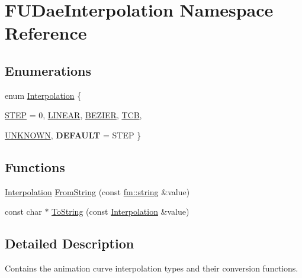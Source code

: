 \hypertarget{namespaceFUDaeInterpolation}{
\section{FUDaeInterpolation Namespace Reference}
\label{namespaceFUDaeInterpolation}
}
\subsection*{Enumerations}
\begin{DoxyCompactItemize}
\item 
enum \hyperlink{namespaceFUDaeInterpolation_a209a941c2fb6ece1325352968aa0374f}{Interpolation} \{ \par
\hyperlink{namespaceFUDaeInterpolation_a209a941c2fb6ece1325352968aa0374fa5e75d1c742698445eeb81394232221e3}{STEP} =  0, 
\hyperlink{namespaceFUDaeInterpolation_a209a941c2fb6ece1325352968aa0374fa1408bf464b40a99bef3cc2cc0ee68984}{LINEAR}, 
\hyperlink{namespaceFUDaeInterpolation_a209a941c2fb6ece1325352968aa0374fa4c3b611ce39dc32e31034f5a371f6fc6}{BEZIER}, 
\hyperlink{namespaceFUDaeInterpolation_a209a941c2fb6ece1325352968aa0374faf23cc444bd432c2656dc29726d423ab2}{TCB}, 
\par
\hyperlink{namespaceFUDaeInterpolation_a209a941c2fb6ece1325352968aa0374fa7788140302de8dabbe8cd54541f077d6}{UNKNOWN}, 
{\bfseries DEFAULT} =  STEP
 \}
\end{DoxyCompactItemize}
\subsection*{Functions}
\begin{DoxyCompactItemize}
\item 
\hyperlink{namespaceFUDaeInterpolation_a209a941c2fb6ece1325352968aa0374f}{Interpolation} \hyperlink{namespaceFUDaeInterpolation_ad39e0d9a16919b9919b78070fe51fb10}{FromString} (const \hyperlink{classfm_1_1stringT}{fm::string} \&value)
\item 
const char $\ast$ \hyperlink{namespaceFUDaeInterpolation_a606683c017bfe84a2ea1655a03f3d22a}{ToString} (const \hyperlink{namespaceFUDaeInterpolation_a209a941c2fb6ece1325352968aa0374f}{Interpolation} \&value)
\end{DoxyCompactItemize}


\subsection{Detailed Description}
Contains the animation curve interpolation types and their conversion functions. 

